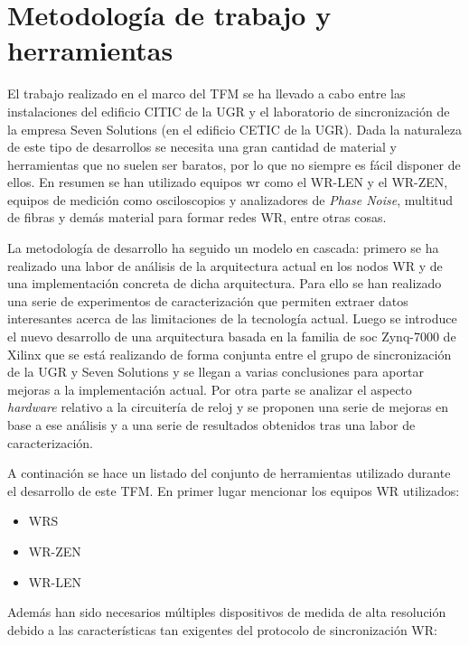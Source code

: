 \chapter{Metodología de trabajo y herramientas}

El trabajo realizado en el marco del TFM se ha llevado a cabo entre las 
instalaciones del edificio CITIC de la UGR y el laboratorio de sincronización 
de la empresa Seven Solutions (en el edificio CETIC de la UGR). Dada la 
naturaleza de este tipo de desarrollos se necesita una gran cantidad de 
material y herramientas que no suelen ser baratos, por lo que no siempre es 
fácil disponer de ellos. En resumen se han utilizado equipos \gls{wr} como el 
WR-LEN y el WR-ZEN, equipos de medición como osciloscopios y analizadores de 
\textit{Phase Noise}, multitud de fibras y demás material para formar redes WR, 
entre otras cosas.

La metodología de desarrollo ha seguido un modelo en cascada: primero se ha 
realizado una labor de análisis de la arquitectura actual en los nodos WR y de 
una implementación concreta de dicha arquitectura. Para ello se han realizado 
una serie de experimentos de caracterización que permiten extraer datos 
interesantes acerca de las limitaciones de la tecnología actual. Luego se 
introduce el nuevo desarrollo de una arquitectura basada en la familia de 
\gls{soc} Zynq-7000 de Xilinx que se está realizando de forma conjunta entre el 
grupo de sincronización de la UGR y Seven Solutions y se llegan a varias 
conclusiones para aportar mejoras a la implementación actual. Por otra parte se 
analizar el aspecto \textit{hardware} relativo a la circuitería de reloj y se 
proponen una serie de mejoras en base a ese análisis y a una serie de 
resultados obtenidos tras una labor de caracterización. 

A continación se hace un listado del conjunto de herramientas utilizado durante 
el desarrollo de este TFM. En primer lugar mencionar los equipos WR utilizados:

\begin{itemize}
	\item WRS 
	\item WR-ZEN 
	\item WR-LEN 
\end{itemize}

Además han sido necesarios múltiples dispositivos de medida de alta resolución 
debido a las características tan exigentes del protocolo de sincronización WR:

